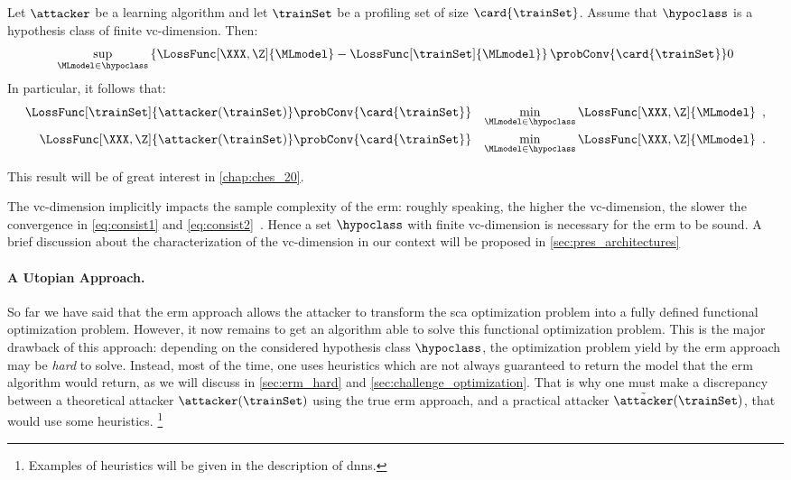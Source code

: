 \begin{theorem}
	\label{thm:consistency}
	Let \(\attacker\) be a learning algorithm and let \(\trainSet\) be a profiling set of size \(\card{\trainSet}\). 
	Assume that \(\hypoclass\) is a hypothesis class of finite \gls{vc}-dimension.
	Then:
	\begin{equation}
		\sup_{\MLmodel \in \hypoclass} \left\{\LossFunc[\XXX, \Z]{\MLmodel}- 
		\LossFunc[\trainSet]{\MLmodel} \right\} \probConv{\card{\trainSet}} 0
	\end{equation}
	In particular, it follows that:
	\begin{eqnarray}
		\LossFunc[\trainSet]{\attacker(\trainSet)}
		& \probConv{\card{\trainSet}}
		& \min_{\MLmodel \in \hypoclass} \LossFunc[\XXX, \Z]{\MLmodel} \enspace ,
		\label{eq:consist1} \\
		\LossFunc[\XXX, \Z]{\attacker(\trainSet)}
		& \probConv{\card{\trainSet}}
		& \min_{\MLmodel \in \hypoclass} \LossFunc[\XXX, \Z]{\MLmodel} \enspace .
		\label{eq:consist2}
	\end{eqnarray}
\end{theorem} 
This result will be of great interest in \autoref{chap:ches_20}.

The \gls{vc}-dimension implicitly impacts the sample complexity of the \gls{erm}: roughly speaking, the higher the \gls{vc}-dimension, the slower the convergence in \autoref{eq:consist1} and \autoref{eq:consist2}~\cite{vapnik_overview_1999}.
Hence a set \(\hypoclass\) with finite \gls{vc}-dimension is necessary for the \gls{erm} to be sound.
A brief discussion about the characterization of the \gls{vc}-dimension in our context will be proposed in \autoref{sec:pres_architectures}

\paragraph{A Utopian Approach.}
So far we have said that the \gls{erm} approach allows the attacker to transform the \gls{sca} optimization problem into a fully defined functional optimization problem.
However, it now remains to get an algorithm able to solve this functional optimization problem.
This is the major drawback of this approach: depending on the considered hypothesis class \(\hypoclass\), the optimization problem yield by the \gls{erm} approach may be \emph{hard} to solve.
Instead, most of the time, one uses heuristics which are not always guaranteed to return the model that the \gls{erm} algorithm would return, as we will discuss in \autoref{sec:erm_hard} and \autoref{sec:challenge_optimization}.
That is why one must make a discrepancy between a theoretical attacker \(\attacker(\trainSet)\) using the true \gls{erm} approach, and a practical attacker \(\tilde{\attacker}(\trainSet)\), that would use some heuristics.%
\footnote{
	Examples of heuristics will be given in the description of \glspl{dnn}.
}


